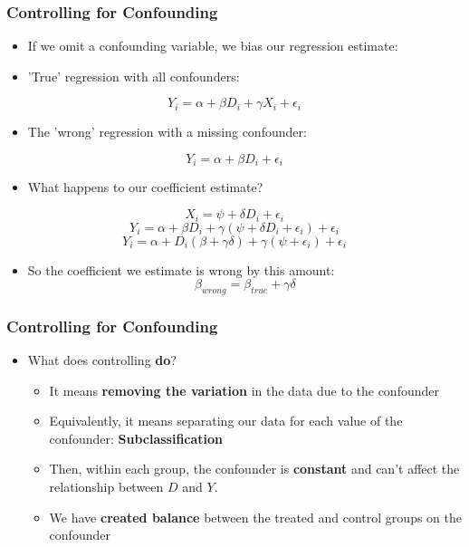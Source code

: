 \documentclass[xcolor=x11names,compress]{beamer}\usepackage[]{graphicx}\usepackage[]{color}
\renewcommand{\(}{\begin{columns}}
\renewcommand{\)}{\end{columns}}
\newcommand{\<}[1]{\begin{column}{#1}}
\renewcommand{\>}{\end{column}}
\begin{document}
\begin{frame}
\frametitle{Controlling for Confounding}
\begin{itemize}
\footnotesize
\item If we omit a confounding variable, we bias our regression estimate:
\pause
\item 'True' regression with all confounders: 
\end{itemize}
$$ Y_i = \alpha + \beta D_i + \gamma X_i + \epsilon_i$$
\begin{itemize}
\pause
\footnotesize
\item The 'wrong' regression with a missing confounder:
\pause
\end{itemize}
$$ Y_i = \alpha + \beta D_i + \epsilon_i$$
\pause
\begin{itemize}
\footnotesize
\item What happens to our coefficient estimate?
\pause
\end{itemize}
$$ X_i = \psi + \delta D_i + \epsilon_i$$
\pause
$$ Y_i = \alpha + \beta D_i + \gamma (\psi + \delta D_i + \epsilon_i) + \epsilon_i $$
\pause
$$ Y_i = \alpha + D_i (\beta + \gamma \delta) + \gamma (\psi  + \epsilon_i) + \epsilon_i $$
\pause
\begin{itemize}
\footnotesize
\item So the coefficient we estimate is wrong by this amount:
\pause
$$ \beta_{wrong} = \beta_{true} + \gamma \delta$$
\end{itemize}
\normalsize
\end{frame}


\begin{frame}
\frametitle{Controlling for Confounding}
\begin{itemize}
\item What does controlling \textbf{do}?
\begin{itemize}
\pause 
\item It means \textbf{removing the variation} in the data due to the confounder
\pause
\item Equivalently, it means separating our data for each value of the confounder: \textbf{Subclassification}
\pause
\item Then, within each group, the confounder is \textbf{constant} and can't affect the relationship between $D$ and $Y$.
\pause
\item We have \textbf{created balance} between the treated and control groups on the confounder
\end{itemize}
\end{itemize}
\end{frame}
\end{document}
